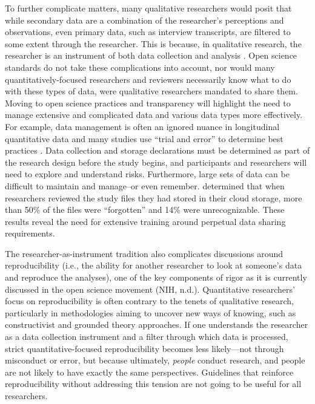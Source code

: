 \documentclass[authordate, meta, issue]{jote-new-article}
\begin{document}
To further complicate matters, many qualitative researchers would posit that while secondary data are a combination of the researcher’s perceptions and observations, even primary data, such as interview transcripts, are filtered to some extent through the researcher. This is because, in qualitative research, the researcher is an instrument of both data collection and analysis \parencites[e.g.,][]{Peredaryenko2013}. Open science standards do not take these complications into account, nor would many quantitatively-focused researchers and reviewers necessarily know what to do with these types of data, were qualitative researchers mandated to share them. Moving to open science practices and transparency will highlight the need to manage extensive and complicated data and various data types more effectively. For example, data management is often an ignored nuance in longitudinal quantitative data and many studies use “trial and error” to determine best practices \parencites{Youngblut1990}. Data collection and storage declarations must be determined as part of the research design before the study begins, and participants and researchers will need to explore and understand risks. Furthermore, large sets of data can be difficult to maintain and manage–or even remember. \textcite{Khan2018} determined that when researchers reviewed the study files they had stored in their cloud storage, more than 50\% of the files were “forgotten” and 14\% were unrecognizable. These results reveal the need for extensive training around perpetual data sharing requirements.



The researcher-as-instrument tradition also complicates discussions around reproducibility (i.e., the ability for another researcher to look at someone’s data and reproduce the analyses), one of the key components of rigor as it is currently discussed in the open science movement (NIH, n.d.). Quantitative researchers’ focus on reproducibility is often contrary to the tenets of qualitative research, particularly in methodologies aiming to uncover new ways of knowing, such as constructivist and grounded theory approaches. If one understands the researcher as a data collection instrument and a filter through which data is processed, strict quantitative-focused reproducibility becomes less likely—not through misconduct or error, but because ultimately, \emph{people }conduct research, and people are not likely to have exactly the same perspectives. Guidelines that reinforce reproducibility without addressing this tension are not going to be useful for all researchers.
\end{document}
